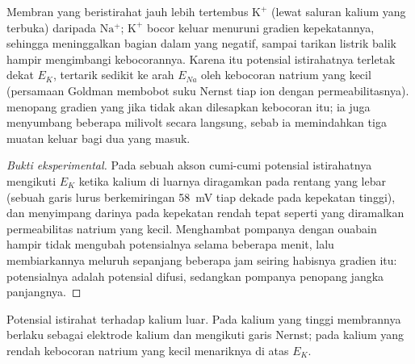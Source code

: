 \begin{proposition}\label{prop:b1:membranes-transport:resting}
Membran yang beristirahat jauh lebih tertembus $\mathrm{K^+}$ (lewat
saluran kalium yang terbuka) daripada $\mathrm{Na^+}$; $\mathrm{K^+}$
bocor keluar menuruni gradien kepekatannya, sehingga meninggalkan bagian
dalam yang negatif, sampai tarikan listrik balik hampir mengimbangi
kebocorannya. Karena itu potensial istirahatnya terletak dekat $E_K$,
tertarik sedikit ke arah $E_{Na}$ oleh kebocoran natrium yang kecil
(persamaan Goldman membobot suku Nernst tiap ion dengan
permeabilitasnya).  menopang gradien yang jika tidak akan
dilesapkan kebocoran itu; ia juga menyumbang beberapa milivolt secara
langsung, sebab ia memindahkan tiga muatan keluar bagi dua yang masuk.
\end{proposition}
\begin{proof}[Bukti eksperimental]
Pada sebuah akson cumi-cumi potensial istirahatnya mengikuti $E_K$
ketika kalium di luarnya diragamkan pada rentang yang lebar (sebuah
garis lurus berkemiringan \qty{58}{mV} tiap dekade pada kepekatan
tinggi), dan menyimpang darinya pada kepekatan rendah tepat seperti
yang diramalkan permeabilitas natrium yang kecil. Menghambat pompanya
dengan ouabain hampir tidak mengubah potensialnya selama beberapa
menit, lalu membiarkannya meluruh sepanjang beberapa jam seiring
habisnya gradien itu: potensialnya adalah potensial difusi, sedangkan
pompanya penopang jangka panjangnya.
\end{proof}

\begin{omfigure}

{\small Potensial istirahat terhadap kalium luar. Pada kalium yang
tinggi membrannya berlaku sebagai elektrode kalium dan mengikuti garis
Nernst; pada kalium yang rendah kebocoran natrium yang kecil
menariknya di atas
$E_K$.}
\end{omfigure}

